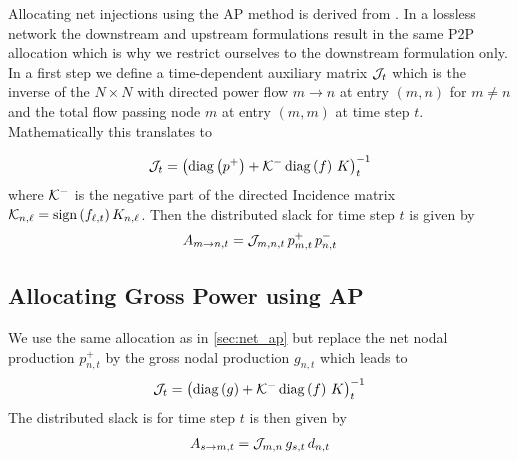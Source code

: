 \documentclass[11pt,twocolumn]{article}
\newcommand{\generation}{g_{s,t}}
\newcommand{\nodalgeneration}[1][n]{g_{#1,t}}
\newcommand{\demand}[1][n]{d_{#1,t}}
\newcommand{\incidence}[1][n]{K_{#1,\ell}}
\newcommand{\flow}{f_{\ell,t}}
\newcommand{\netconsumption}[1][n]{p^{-}_{#1,t}}
\newcommand{\netproduction}[1][n]{p^{+}_{#1,t}}
\newcommand{\allocatePeer}[1][s \rightarrow n]{A_{#1,t}}
\begin{document}
Allocating net injections using the AP method is derived from \cite{achayuthakan_electricity_2010-1}. In a lossless network the downstream and upstream formulations result in the same P2P allocation which is why we restrict ourselves to the downstream formulation only. In a first step we define a time-dependent auxiliary matrix $\mathcal{J}_t$ which is the inverse of the $N\times N$ with directed power flow $m \rightarrow n$ at entry $(m, n)$ for $m \ne n$ and the total flow passing node $m$ at entry $\left( m, m\right)$ at time step $t$. Mathematically this translates to


\begin{align}
\mathcal{J}_t = \left( \operatorname{diag}\left(p^+\right) + \mathcal{K}^- \operatorname{diag}\left(f\right) \, K \right)_t^{-1} 
\end{align}
where $\mathcal{K}^-$ is the negative part of the directed Incidence matrix $\DirectedIncidence_{n,\ell} = \text{sign}\left( \flow \right)  \incidence$. Then the distributed slack for time step $t$ is given by
\begin{align}
\allocatePeer[m \rightarrow n] = \InverseAPInjection_{m,n,t} \, \netproduction[m] \, \netconsumption
\end{align}

\subsection{Allocating Gross Power using AP}
\label{sec:gross_ap}

We use the same allocation as in \cref{sec:net_ap} but replace the net nodal production $\netproduction$ by the gross nodal production $\nodalgeneration$ which leads to  
\begin{align}
\mathcal{J}_t = \left( \operatorname{diag}\left(g\right) + \mathcal{K}^- \operatorname{diag}\left(f\right) \, K \right)_t^{-1} 
\end{align}
The distributed slack is for time step $t$ is then given by
\begin{align}
\allocatePeer[s \rightarrow m] = \InverseAPInjection_{m,n} \, \generation \, \demand
\end{align}
\end{document}
